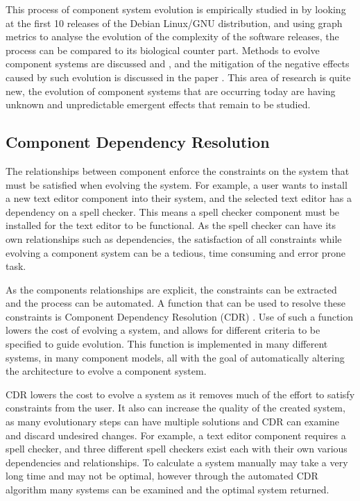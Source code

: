This process of component system evolution is empirically studied in \cite{fortuna2011} by looking at the first 10 releases of the Debian Linux/GNU distribution,
and using graph metrics to analyse the evolution of the complexity of the software releases, the process can be compared to its biological counter part.
Methods to evolve component systems are discussed \cite{Ryan2005} and \cite{Luo2004},
and the mitigation of the negative effects caused by such evolution is discussed in the paper \cite{Stuckenholz2007}.
This area of research is quite new, the evolution of component systems that are occurring today are having unknown and unpredictable emergent effects that remain to be studied.

\subsection{Component Dependency Resolution}
The relationships between component enforce the constraints on the system that must be satisfied when evolving the system.
For example, a user wants to install a new text editor component into their system, and the selected text editor has a dependency on a spell checker.
This means a spell checker component must be installed for the text editor to be functional.
As the spell checker can have its own relationships such as dependencies, 
the satisfaction of all constraints while evolving a component system can be a tedious, time consuming and error prone task.

As the components relationships are explicit, the constraints can be extracted and the process can be automated.
A function that can be used to resolve these constraints is Component Dependency Resolution (CDR) \cite{Jenson2010}.
Use of such a function lowers the cost of evolving a system, and allows for different criteria to be specified to guide evolution.
This function is implemented in many different systems, in many component models, all with the goal of automatically altering the architecture to evolve a component system.

CDR lowers the cost to evolve a system as it removes much of the effort to satisfy constraints from the user.
It also can increase the quality of the created system, as many evolutionary steps can have multiple solutions and CDR can examine and discard undesired changes.
For example, a  text editor component requires a spell checker, and three different spell checkers exist each with their own various dependencies and relationships.
To calculate a system manually may take a very long time and may not be optimal, however through the automated CDR algorithm many systems can be examined and the optimal system returned.

